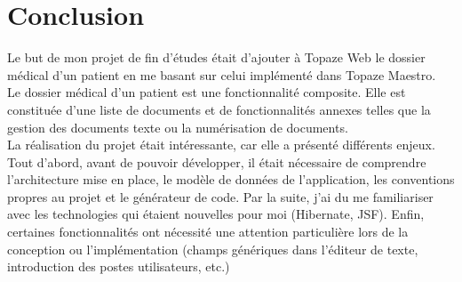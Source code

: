 \newpage
\section*{Conclusion} %

Le but de mon projet de fin d'études était d'ajouter à Topaze Web le dossier médical d'un patient en me basant sur celui implémenté dans Topaze Maestro.\\
Le dossier médical d'un patient est une fonctionnalité composite. Elle est constituée d'une liste de documents et de fonctionnalités annexes telles que la gestion des documents texte ou la numérisation de documents.\\

La réalisation du projet était intéressante, car elle a présenté différents enjeux. Tout d'abord, avant de pouvoir développer, il était nécessaire de comprendre l'architecture mise en place, le modèle de données de l'application, les conventions propres au projet et le générateur de code. Par la suite, j'ai du me familiariser avec les technologies qui étaient nouvelles pour moi (Hibernate, JSF). Enfin, certaines fonctionnalités ont nécessité une attention particulière lors de la conception ou l'implémentation (champs génériques dans l'éditeur de texte, introduction des postes utilisateurs, etc.)\\

